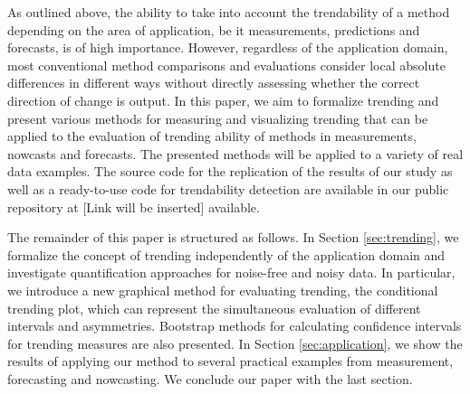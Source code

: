 As outlined above, the ability to take into account the trendability of a method depending on the area of application, be it measurements, predictions and forecasts, is of high importance. 
However, regardless of the application domain, most conventional method comparisons and evaluations consider local absolute differences in different ways without directly assessing whether the correct direction of change is output. 
In this paper, we aim to formalize trending and present various methods for measuring and visualizing trending that can be applied to the evaluation of trending ability of methods in measurements, nowcasts and forecasts. 
The presented methods will be applied to a variety of real data examples. The source code for the replication of the results of our study as well as a ready-to-use code for trendability detection are available in our public repository at [Link will be inserted] available.

The remainder of this paper is structured as follows. 
In Section \ref{sec:trending}, we formalize the concept of trending independently of the application domain and investigate quantification approaches for noise-free and noisy data. 
In particular, we introduce a new graphical method for evaluating trending, the conditional trending plot, which can represent the simultaneous evaluation of different intervals and asymmetries. 
Bootstrap methods for calculating confidence intervals for trending measures are also presented. 
In Section \ref{sec:application}, we show the results of applying our method to several practical examples from measurement, forecasting and nowcasting. 
We conclude our paper with the last section.
